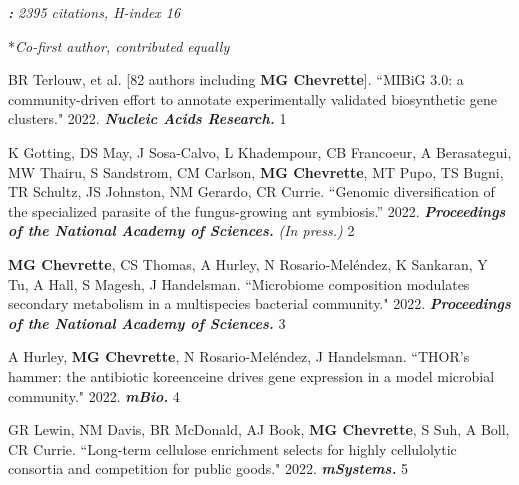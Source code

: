 

\textit{\textbf{:} 2395 citations, H-index 16}

 \vspace{-2mm}

\begin{cvpubs}


\cvpub
{\hspace{-1cm} *\textit{Co-first author, contributed equally}} %
{}

\cvpub
{BR Terlouw, et al. [82 authors including \textbf{MG Chevrette}]. ``MIBiG 3.0: a community-driven effort to annotate experimentally validated biosynthetic gene clusters." 2022. \textit{\textbf{Nucleic Acids Research.}} \textit{\textbf{}}}
{1}

\cvpub
{K Gotting, DS May, J Sosa-Calvo, L Khadempour, CB Francoeur, A Berasategui, MW Thairu, S Sandstrom, CM Carlson, \textbf{MG Chevrette}, MT Pupo, TS Bugni, TR Schultz, JS Johnston, NM Gerardo, CR Currie. ``Genomic diversification of the specialized parasite of the fungus-growing ant symbiosis.” 2022. \textit{\textbf{Proceedings of the National Academy of Sciences.}} \textit{(In press.)}}
{2}


\cvpub
{\textbf{MG Chevrette}, CS Thomas, A Hurley, N Rosario-Meléndez, K Sankaran, Y Tu, A Hall, S Magesh, J Handelsman. ``Microbiome composition modulates secondary metabolism in a multispecies bacterial community." 2022. \textit{\textbf{Proceedings of the National Academy of Sciences.}} \textit{\textbf{}}}
{3}

\cvpub
{A Hurley, \textbf{MG Chevrette}, N Rosario-Mel\'{e}ndez, J Handelsman. ``THOR's hammer: the antibiotic koreenceine drives gene expression in a model microbial community." 2022. \textit{\textbf{mBio.}} \textit{\textbf{}}}
{4}

\cvpub
{GR Lewin, NM Davis, BR McDonald, AJ Book, \textbf{MG Chevrette}, S Suh, A Boll, CR Currie. ``Long-term cellulose enrichment selects for highly cellulolytic consortia and competition for public goods." 2022. \textit{\textbf{mSystems.}} \textit{\textbf{}}}
{5}


\end{cvpubs}
